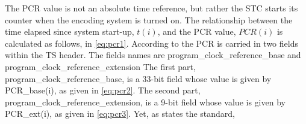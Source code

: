 \documentclass[
	12pt,				%
	openright,			%
	twoside,			%
	a4paper,			%
	brazil,
	french,				%
	english
	]{abntex2}
\begin{document}
The PCR value is not an absolute time reference, but rather the STC starts its counter when the encoding system is turned on. The relationship between the time elapsed since system start-up, $t(i)$, and the PCR value, $PCR(i)$ is calculated as follows, in \autoref{eq:pcr1}. According to  the PCR is carried in two fields within the TS header. The fields names are program\hspace{0.1mm}\_\hspace{0.1mm}clock\hspace{0.1mm}\_\hspace{0.1mm}reference\hspace{0.1mm}\_\hspace{0.1mm}base and program\hspace{0.1mm}\_\hspace{0.1mm}clock\hspace{0.1mm}\_\hspace{0.1mm}reference\hspace{0.1mm}\_\hspace{0.1mm}extension The first part, program\hspace{0.1mm}\_\hspace{0.1mm}clock\hspace{0.1mm}\_\hspace{0.1mm}reference\hspace{0.1mm}\_\hspace{0.1mm}base, is a 33-bit field whose value is given by PCR\hspace{0.1mm}\_\hspace{0.1mm}base(i), as given in \autoref{eq:pcr2}. The second part, program\hspace{0.1mm}\_\hspace{0.1mm}clock\hspace{0.1mm}\_\hspace{0.1mm}reference\hspace{0.1mm}\_\hspace{0.1mm}extension, is a 9-bit field whose value is given by PCR\hspace{0.1mm}\_\hspace{0.1mm}ext(i), as given in \autoref{eq:pcr3}. Yet, as states the standard, 
\end{document}
